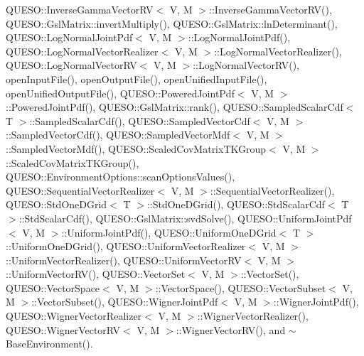 Q\-U\-E\-S\-O\-::\-Inverse\-Gamma\-Vector\-R\-V$<$ V, M $>$\-::\-Inverse\-Gamma\-Vector\-R\-V(), Q\-U\-E\-S\-O\-::\-Gsl\-Matrix\-::invert\-Multiply(), Q\-U\-E\-S\-O\-::\-Gsl\-Matrix\-::ln\-Determinant(), Q\-U\-E\-S\-O\-::\-Log\-Normal\-Joint\-Pdf$<$ V, M $>$\-::\-Log\-Normal\-Joint\-Pdf(), Q\-U\-E\-S\-O\-::\-Log\-Normal\-Vector\-Realizer$<$ V, M $>$\-::\-Log\-Normal\-Vector\-Realizer(), Q\-U\-E\-S\-O\-::\-Log\-Normal\-Vector\-R\-V$<$ V, M $>$\-::\-Log\-Normal\-Vector\-R\-V(), open\-Input\-File(), open\-Output\-File(), open\-Unified\-Input\-File(), open\-Unified\-Output\-File(), Q\-U\-E\-S\-O\-::\-Powered\-Joint\-Pdf$<$ V, M $>$\-::\-Powered\-Joint\-Pdf(), Q\-U\-E\-S\-O\-::\-Gsl\-Matrix\-::rank(), Q\-U\-E\-S\-O\-::\-Sampled\-Scalar\-Cdf$<$ T $>$\-::\-Sampled\-Scalar\-Cdf(), Q\-U\-E\-S\-O\-::\-Sampled\-Vector\-Cdf$<$ V, M $>$\-::\-Sampled\-Vector\-Cdf(), Q\-U\-E\-S\-O\-::\-Sampled\-Vector\-Mdf$<$ V, M $>$\-::\-Sampled\-Vector\-Mdf(), Q\-U\-E\-S\-O\-::\-Scaled\-Cov\-Matrix\-T\-K\-Group$<$ V, M $>$\-::\-Scaled\-Cov\-Matrix\-T\-K\-Group(), Q\-U\-E\-S\-O\-::\-Environment\-Options\-::scan\-Options\-Values(), Q\-U\-E\-S\-O\-::\-Sequential\-Vector\-Realizer$<$ V, M $>$\-::\-Sequential\-Vector\-Realizer(), Q\-U\-E\-S\-O\-::\-Std\-One\-D\-Grid$<$ T $>$\-::\-Std\-One\-D\-Grid(), Q\-U\-E\-S\-O\-::\-Std\-Scalar\-Cdf$<$ T $>$\-::\-Std\-Scalar\-Cdf(), Q\-U\-E\-S\-O\-::\-Gsl\-Matrix\-::svd\-Solve(), Q\-U\-E\-S\-O\-::\-Uniform\-Joint\-Pdf$<$ V, M $>$\-::\-Uniform\-Joint\-Pdf(), Q\-U\-E\-S\-O\-::\-Uniform\-One\-D\-Grid$<$ T $>$\-::\-Uniform\-One\-D\-Grid(), Q\-U\-E\-S\-O\-::\-Uniform\-Vector\-Realizer$<$ V, M $>$\-::\-Uniform\-Vector\-Realizer(), Q\-U\-E\-S\-O\-::\-Uniform\-Vector\-R\-V$<$ V, M $>$\-::\-Uniform\-Vector\-R\-V(), Q\-U\-E\-S\-O\-::\-Vector\-Set$<$ V, M $>$\-::\-Vector\-Set(), Q\-U\-E\-S\-O\-::\-Vector\-Space$<$ V, M $>$\-::\-Vector\-Space(), Q\-U\-E\-S\-O\-::\-Vector\-Subset$<$ V, M $>$\-::\-Vector\-Subset(), Q\-U\-E\-S\-O\-::\-Wigner\-Joint\-Pdf$<$ V, M $>$\-::\-Wigner\-Joint\-Pdf(), Q\-U\-E\-S\-O\-::\-Wigner\-Vector\-Realizer$<$ V, M $>$\-::\-Wigner\-Vector\-Realizer(), Q\-U\-E\-S\-O\-::\-Wigner\-Vector\-R\-V$<$ V, M $>$\-::\-Wigner\-Vector\-R\-V(), and $\sim$\-Base\-Environment().


